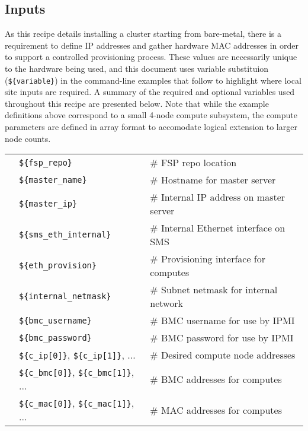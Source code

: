 
\subsection{Inputs} \label{sec:inputs}
As this recipe details installing a cluster starting from bare-metal, there is a requirement to define IP addresses and
gather hardware MAC addresses in order to support a controlled provisioning process. These values are necessarily unique
to the hardware being used, and this document uses variable substituion (\texttt{\$\{variable\}}) in the command-line
examples that follow to highlight where local site inputs are required. A summary of the required and optional variables
used throughout this recipe are presented below. Note that while the example definitions above correspond to a small
4-node compute subsystem, the compute parameters are defined in array format to accomodate logical extension to larger
node counts. \\

\vspace*{0.2cm}
\begin{tabular}{@{}>{\textbullet}l p{7cm} l}
& \texttt{\$\{fsp\_repo\}} & {\small \# FSP repo location} \\
& \texttt{\$\{master\_name\}} & {\small \# Hostname for master server} \\
& \texttt{\$\{master\_ip\}} & {\small \# Internal IP address on master server}  \\
& \texttt{\$\{sms\_eth\_internal\}} & {\small \# Internal Ethernet interface on SMS} \\
& \texttt{\$\{eth\_provision\}} & {\small \# Provisioning interface for computes} \\
& \texttt{\$\{internal\_netmask\}} & {\small \# Subnet netmask for internal network} \\
& \texttt{\$\{bmc\_username\}} & {\small \# BMC username for use by IPMI} \\
& \texttt{\$\{bmc\_password\}} & {\small \# BMC password for use by IPMI} \\
& \texttt{\$\{c\_ip[0]\}}, \texttt{\$\{c\_ip[1]\}}, ... & {\small \# Desired compute node addresses} \\
& \texttt{\$\{c\_bmc[0]\}}, \texttt{\$\{c\_bmc[1]\}}, ... & {\small \# BMC addresses for computes} \\
& \texttt{\$\{c\_mac[0]\}}, \texttt{\$\{c\_mac[1]\}}, ... & {\small \# MAC addresses for computes} \\
\end{tabular}

